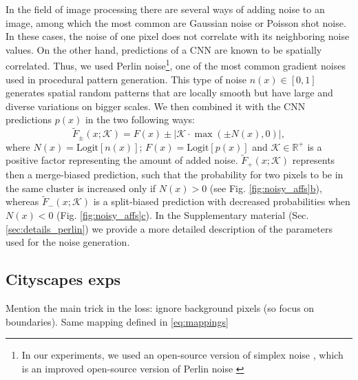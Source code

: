 In the field of image processing there are several ways of adding noise to an image, among which the most common are Gaussian noise or Poisson shot noise. 
In these cases, the noise of one pixel does not correlate with its neighboring noise values. On the other hand, predictions of a CNN are known to be spatially correlated. 
Thus, we used Perlin noise\footnote{In our experiments, we used an open-source version of simplex noise \cite{perlin2001noise}, which is an improved open-source version of Perlin noise \cite{perlin1985image}}, one of the most common gradient noises used in procedural pattern generation. This type of noise $n(x)\in[0,1]$ generates spatial random patterns that are locally smooth but have large and diverse variations on bigger scales. We then combined it with the CNN predictions $p(x)$ in the two following ways: 
\begin{equation}\label{eq:noise_biased_predictions}
\tilde{F}_{\pm}(x;\mathcal{K})=F(x)\pm\big|\mathcal{K}\cdot\max\left(\pm N(x),0\right)\big|,
\end{equation}
where  $N(x)=\mathrm{Logit}[n(x)]$; $F(x)=\mathrm{Logit}[p(x)]$ and $\mathcal{K}\in \mathbb{R}^+$ is a positive factor representing the amount of added noise. $\tilde{F}_{+}(x;\mathcal{K})$ represents then a merge-biased prediction, such that the probability for two pixels to be in the same cluster is increased only if $N(x)>0$ (see Fig. \hyperref[fig:noisy_affs]{\ref*{fig:noisy_affs}b}), whereas $\tilde{F}_{-}(x;\mathcal{K})$ is a split-biased prediction with decreased probabilities when $N(x)<0$ (Fig. \hyperref[fig:noisy_affs]{\ref*{fig:noisy_affs}c}). In the Supplementary material (Sec. \ref{sec:details_perlin}) we provide a more detailed description of the parameters used for the noise generation.


\subsection{Cityscapes exps}
Mention the main trick in the loss: ignore background pixels (so focus on boundaries). Same mapping defined in \ref{eq:mappings}


